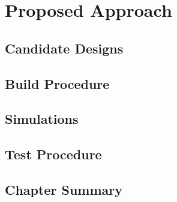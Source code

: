 \chapter{Proposed Approach}
\section{Candidate Designs}
\section{Build Procedure}
\section{Simulations}
\section{Test Procedure}
\section{Chapter Summary}
